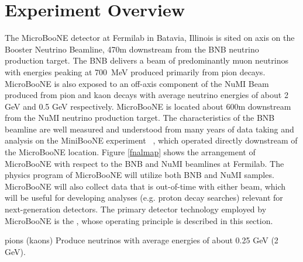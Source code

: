 \section{Experiment Overview}
\label{sec:overview}

The MicroBooNE detector at Fermilab in Batavia, Illinois is sited on axis on the Booster Neutrino Beamline, 470m downstream from the BNB neutrino production target.   The BNB delivers a beam of predominantly muon neutrinos with energies peaking at 700~MeV produced primarily from pion decays. MicroBooNE is also exposed to an off-axis component of the NuMI Beam ~\cite{NuMIbeam} produced from pion and kaon decays with average neutrino energies of about 2 GeV and 0.5 GeV respectively.   MicroBooNE is located about 600m downstream from the NuMI neutrino production target.  The characteristics of the BNB beamline are well measured and understood from many years of data taking and analysis on the MiniBooNE experiment ~\cite{AguilarArevalo:2008-MBflux}, which operated directly downstream of the MicroBooNE location.  Figure \ref{fnalmap} shows the arrangement of MicroBooNE with respect to the BNB and NuMI beamlines at Fermilab.  The physics program of MicroBooNE will utilize both BNB and NuMI samples.  MicroBooNE will also collect data that is out-of-time with either beam, which will be useful for developing analyses (e.g. proton decay searches) relevant for next-generation detectors.  The primary detector technology employed by MicroBooNE is the \lartpc, whose operating principle is described in this section.

pions (kaons) Produce neutrinos with average energies of about 0.25 GeV (2 GeV).   

